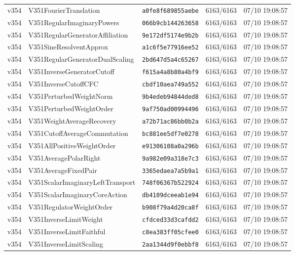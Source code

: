\documentclass[11pt]{article}
\theoremstyle{definition}\newtheorem{deriv}{Derivation}
\begin{document}
{\begin{longtable}{@{}lllll@{}}
v354 & V351FourierTranslation & \texttt{a0fe8f689855aebe} & 6163/6163 & 07/10 19:08:57 \\
v354 & V351RegularImaginaryPowers & \texttt{066b9cb144263658} & 6163/6163 & 07/10 19:08:57 \\
v354 & V351RegularGeneratorAffiliation & \texttt{9e172df5174e9b2b} & 6163/6163 & 07/10 19:08:57 \\
v354 & V351SineResolventApprox & \texttt{a1c6f5e77916ee52} & 6163/6163 & 07/10 19:08:57 \\
v354 & V351RegularGeneratorDualScaling & \texttt{2bd647d5a4c65267} & 6163/6163 & 07/10 19:08:57 \\
v354 & V351InverseGeneratorCutoff & \texttt{f615a4a8b80a4bf9} & 6163/6163 & 07/10 19:08:57 \\
v354 & V351InverseCutoffCFC & \texttt{cbdf10aea749a552} & 6163/6163 & 07/10 19:08:57 \\
v354 & V351PerturbedWeightNorm & \texttt{9b4edeb94844ded8} & 6163/6163 & 07/10 19:08:57 \\
v354 & V351PerturbedWeightOrder & \texttt{9af750ad00994496} & 6163/6163 & 07/10 19:08:57 \\
v354 & V351WeightAverageRecovery & \texttt{a72b71ac86bb0b2a} & 6163/6163 & 07/10 19:08:57 \\
v354 & V351CutoffAverageCommutation & \texttt{bc881ee5df7e0278} & 6163/6163 & 07/10 19:08:57 \\
v354 & V351AllPositiveWeightOrder & \texttt{e91306108a0a296b} & 6163/6163 & 07/10 19:08:57 \\
v354 & V351AveragePolarRight & \texttt{9a982e09a318e7c3} & 6163/6163 & 07/10 19:08:57 \\
v354 & V351AverageFixedPair & \texttt{3365edaea7a5b9a1} & 6163/6163 & 07/10 19:08:57 \\
v354 & V351ScalarImaginaryLeftTransport & \texttt{748f06367b522924} & 6163/6163 & 07/10 19:08:57 \\
v354 & V351ScalarImaginaryCoreAction & \texttt{db4109dceeab1e94} & 6163/6163 & 07/10 19:08:57 \\
v354 & V351RegulatorWeightOrder & \texttt{b908f79a4d20ca8f} & 6163/6163 & 07/10 19:08:57 \\
v354 & V351InverseLimitWeight & \texttt{cfdced33d3cafdd2} & 6163/6163 & 07/10 19:08:57 \\
v354 & V351InverseLimitFaithful & \texttt{c8ea383ff05cfee0} & 6163/6163 & 07/10 19:08:57 \\
v354 & V351InverseLimitScaling & \texttt{2aa1344d9f0ebbf8} & 6163/6163 & 07/10 19:08:57 \\

\end{longtable}}
\end{document}
